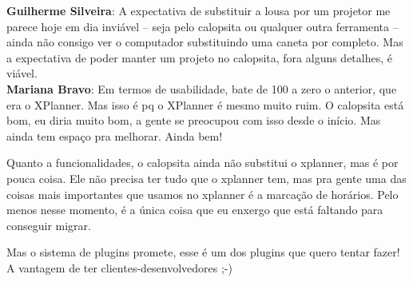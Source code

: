 \textbf{Guilherme Silveira}: A expectativa de substituir a lousa por um projetor me parece hoje em dia inviável -- seja pelo calopsita ou qualquer outra ferramenta -- ainda não consigo ver o computador substituindo uma caneta por completo. Mas a expectativa de poder manter um projeto no calopsita, fora alguns detalhes, é viável.\\

\textbf{Mariana Bravo}: Em termos de usabilidade, bate de 100 a zero o anterior, que era o XPlanner. Mas isso é pq o XPlanner é mesmo muito ruim. O calopsita está bom, eu diria muito bom, a gente se preocupou com isso desde o início. Mas ainda tem espaço pra melhorar. Ainda bem!

Quanto a funcionalidades, o calopsita ainda não substitui o xplanner, mas é por pouca coisa. Ele não precisa ter tudo que o xplanner tem, mas pra gente uma das coisas mais importantes que usamos no xplanner é a marcação de horários. Pelo menos nesse momento, é a única coisa que eu enxergo que está faltando para conseguir migrar.

Mas o sistema de plugins promete, esse é um dos plugins que quero tentar fazer! A vantagem de ter clientes-desenvolvedores ;-)
